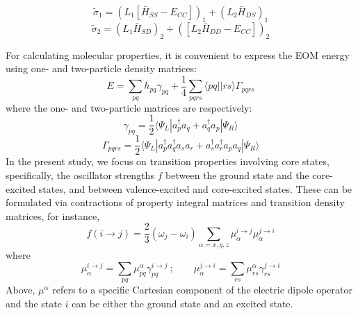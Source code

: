\documentclass[journal=jctcce,manuscript=article]{achemso}
\begin{document}
\begin{equation} 
\tilde{\sigma}_1 = (L_1[\bar{H}_{SS}-E_{CC}])_1 + (L_2\bar{H}_{DS})_1
\end{equation}
\begin{equation} 
\tilde{\sigma}_2 = (L_1\bar{H}_{SD})_2 + ([L_2\bar{H}_{DD}-E_{CC}])_2
\end{equation}

For calculating molecular properties, it is convenient to express the EOM energy using one- and two-particle density matrices:
\begin{equation}
E = \sum_{pq} h_{pq} \gamma_{pq} + \frac{1}{4} \sum_{pqrs} \langle pq ||rs \rangle \Gamma_{pqrs}
\end{equation}
where the one- and two-particle matrices are respectively:
\begin{equation}
\label{gamma}
 \gamma_{pq} = \frac{1}{2} \langle \Psi_L | a_p^\dagger a_q + a_q^\dagger a_p | \Psi_R \rangle
\end{equation}
\begin{equation}
 \Gamma_{pqrs} = \frac{1}{2} \langle \Psi_L | a_p^\dagger a_q^\dagger a_s a_r + a_s^\dagger a_r^\dagger a_p a_q| \Psi_R \rangle
\end{equation}
In the present study, we focus on transition properties involving core states, specifically, the oscillator strengths $f$ between the ground state and the core-excited states, and between valence-excited and core-excited states. 
These can be formulated via contractions of property integral matrices and transition density matrices, for instance,
\begin{equation}
f (i \to j) = \frac{2}{3}(\omega_j - \omega_i) \sum_{\alpha=x,y,z} \mu^{i\to j}_{\alpha} 
\mu^{j\to i}_{\alpha}
\end{equation}
where 
\begin{equation}
\mu_\alpha^{i\to j}
= \sum_{pq} \mu^{\alpha}_{pq} \gamma^{ i\to j}_{pq}~; \quad \quad
\mu_\alpha^{j\to i} = \sum_{rs} \mu^{\alpha}_{rs} \gamma^{j\to i }_{rs}
\label{strength}
\end{equation}
Above, $\mu^\alpha$ refers to a specific Cartesian component of the electric dipole operator and the state $i$ can be either the ground state and an excited state.
\end{document}
